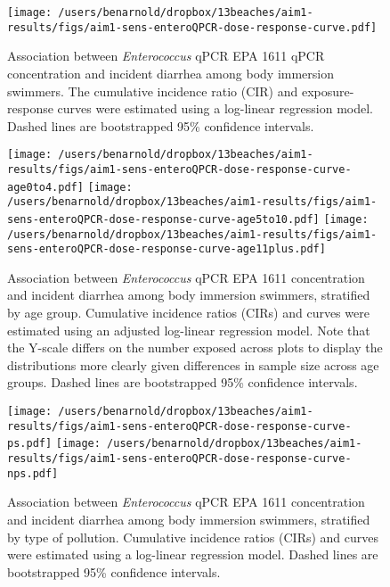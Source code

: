 \documentclass[12pt]{article}\usepackage[]{graphicx}\usepackage[]{color}
\begin{document}
\begin{figure}[h!tb]
\begin{center}
\texttt{[image: /users/benarnold/dropbox/13beaches/aim1-results/figs/aim1-sens-enteroQPCR-dose-response-curve.pdf]}
\caption{Association between \emph{Enterococcus} qPCR EPA 1611 qPCR concentration and incident diarrhea among body immersion swimmers. The cumulative incidence ratio (CIR) and exposure-response curves were estimated using a log-linear regression model.  Dashed lines are bootstrapped 95\% confidence intervals. \label{fig:enteroQPCRcurve}}
\end{center}
\end{figure}


\begin{landscape}
\begin{figure}[h!tb]
\begin{center}
\texttt{[image: /users/benarnold/dropbox/13beaches/aim1-results/figs/aim1-sens-enteroQPCR-dose-response-curve-age0to4.pdf]}
\texttt{[image: /users/benarnold/dropbox/13beaches/aim1-results/figs/aim1-sens-enteroQPCR-dose-response-curve-age5to10.pdf]}
\texttt{[image: /users/benarnold/dropbox/13beaches/aim1-results/figs/aim1-sens-enteroQPCR-dose-response-curve-age11plus.pdf]}
\caption{Association between \emph{Enterococcus} qPCR EPA 1611 concentration and incident diarrhea among body immersion swimmers, stratified by age group. Cumulative incidence ratios (CIRs) and curves were estimated using an adjusted log-linear regression model. Note that the Y-scale differs on the number exposed across plots to display the distributions more clearly given differences in sample size across age groups. Dashed lines are bootstrapped 95\% confidence intervals.  \label{fig:enteroQPCRagecurve}}
\end{center}
\end{figure}
\end{landscape}

\begin{landscape}
\begin{figure}[h!tb]
\begin{center}
\texttt{[image: /users/benarnold/dropbox/13beaches/aim1-results/figs/aim1-sens-enteroQPCR-dose-response-curve-ps.pdf]}
\texttt{[image: /users/benarnold/dropbox/13beaches/aim1-results/figs/aim1-sens-enteroQPCR-dose-response-curve-nps.pdf]}
\caption{Association between \emph{Enterococcus} qPCR EPA 1611 concentration and incident diarrhea among body immersion swimmers, stratified by type of pollution. Cumulative incidence ratios (CIRs) and curves were estimated using a log-linear regression model. Dashed lines are bootstrapped 95\% confidence intervals.  \label{fig:enteroQPCRpscurve}}
\end{center}
\end{figure}
\end{landscape}
\end{document}
